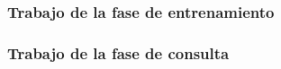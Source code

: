 \subsubsection{Trabajo de la fase de entrenamiento}

\subsubsection{Trabajo de la fase de consulta}


















